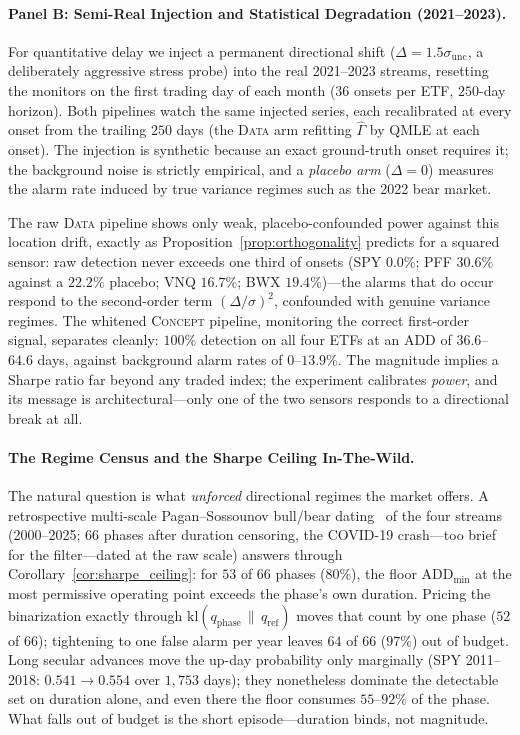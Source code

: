 \documentclass[sigconf,anonymous,review]{acmart}
\theoremstyle{acmdefinition}
\begin{document}
\paragraph{Panel B: Semi-Real Injection and Statistical Degradation (2021--2023).}
For quantitative delay we inject a permanent directional shift ($\Delta = 1.5\sigma_{\mathrm{unc}}$, a deliberately aggressive stress probe) into the real 2021--2023 streams, resetting the monitors on the first trading day of each month ($36$ onsets per ETF, $250$-day horizon). Both pipelines watch the same injected series, each recalibrated at every onset from the trailing $250$ days (the \textsc{Data} arm refitting $\hat{\Gamma}$ by QMLE at each onset). The injection is synthetic because an exact ground-truth onset requires it; the background noise is strictly empirical, and a \emph{placebo arm} ($\Delta = 0$) measures the alarm rate induced by true variance regimes such as the 2022 bear market.

The raw \textsc{Data} pipeline shows only weak, placebo-confounded power against this location drift, exactly as Proposition~\ref{prop:orthogonality} predicts for a squared sensor: raw detection never exceeds one third of onsets (SPY $0.0\%$; PFF $30.6\%$ against a $22.2\%$ placebo; VNQ $16.7\%$; BWX $19.4\%$)---the alarms that do occur respond to the second-order term $(\Delta/\sigma)^2$, confounded with genuine variance regimes. The whitened \textsc{Concept} pipeline, monitoring the correct first-order signal, separates cleanly: $100\%$ detection on all four ETFs at an ADD of $36.6$--$64.6$ days, against background alarm rates of $0$--$13.9\%$. The magnitude implies a Sharpe ratio far beyond any traded index; the experiment calibrates \emph{power}, and its message is architectural---only one of the two sensors responds to a directional break at all.

\paragraph{The Regime Census and the Sharpe Ceiling In-The-Wild.}
The natural question is what \emph{unforced} directional regimes the market offers. A retrospective multi-scale Pagan--Sossounov bull/bear dating~\cite{pagan_sossounov_2003} of the four streams (2000--2025; $66$ phases after duration censoring, the COVID-19 crash---too brief for the filter---dated at the raw scale) answers through Corollary~\ref{cor:sharpe_ceiling}: for $53$ of $66$ phases ($80\%$), the floor $\mathrm{ADD}_{\min}$ at the most permissive operating point exceeds the phase's own duration. Pricing the binarization exactly through $\mathrm{kl}(q_{\mathrm{phase}}\,\|\,q_{\mathrm{ref}})$ moves that count by one phase ($52$ of $66$); tightening to one false alarm per year leaves $64$ of $66$ ($97\%$) out of budget. Long secular advances move the up-day probability only marginally (SPY 2011--2018: $0.541 \to 0.554$ over $1{,}753$ days); they nonetheless dominate the detectable set on duration alone, and even there the floor consumes $55$--$92\%$ of the phase. What falls out of budget is the short episode---duration binds, not magnitude.
\end{document}
